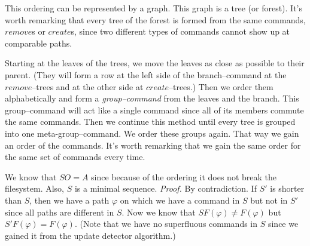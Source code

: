 This ordering can be represented by a graph. This graph is a tree (or
forest). It's worth remarking that every tree of the forest is formed
from the same commands, \(remove\)s or \(create\)s, since two different
types of commands cannot show up at comparable paths. 

Starting at the leaves of the trees, we move the leaves as close as
possible to their parent. (They will form a row at the left side of the
branch--command at the \(remove\)--trees and at the other side at
\(create\)--trees.) Then we order them alphabetically and form a
\emph{group--command} from the leaves and the branch. This
group--command
will act like a single command since all of its members commute the
same commands. Then we continue this method until every tree is
grouped into one meta-group--command. We order these groups again.
That way we gain an order of the commands. It's worth remarking that
we gain the same order for the same set of commands every time.

We know that \(SO=A\) since because of the ordering it does not break the
filesystem. Also, \(S\) is a minimal sequence. \emph{Proof.} 
By contradiction.
If \(S'\) is shorter than \(S\), then we have a path \(\varphi\) on which
we have a command in \(S\) but not in \(S'\) since all paths are different
in \(S\). Now we know that \(SF(\varphi)\ne F(\varphi)\) but 
\(S'F(\varphi)=F(\varphi)\). (Note that we have no superfluous commands
in \(S\) since we gained it from the update detector algorithm.)

